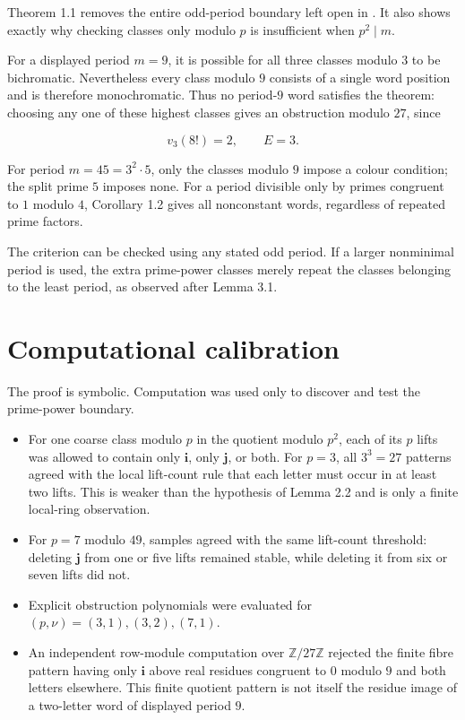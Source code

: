 \documentclass[11pt]{article}
\numberwithin{equation}{section}
\begin{document}
Theorem 1.1 removes the entire odd-period boundary left open in \cite{carptopus2026}. It also
shows exactly why checking classes only modulo $p$ is insufficient when
$p^2\mid m$.

For a displayed period $m=9$, it is possible for all three classes modulo
$3$ to be bichromatic. Nevertheless every class modulo $9$ consists of a
single word position and is therefore monochromatic. Thus no period-$9$
word satisfies the theorem: choosing any one of these highest classes gives
an obstruction modulo $27$, since

\[
v_3(8!)=2,
\qquad E=3.
\]

For period $m=45=3^2\cdot5$, only the classes modulo $9$ impose a colour
condition; the split prime $5$ imposes none. For a period divisible only by
primes congruent to $1$ modulo $4$, Corollary 1.2 gives all nonconstant
words, regardless of repeated prime factors.

The criterion can be checked using any stated odd period. If a larger
nonminimal period is used, the extra prime-power classes merely repeat the
classes belonging to the least period, as observed after Lemma 3.1.

\section{Computational calibration}


The proof is symbolic. Computation was used only to discover and test the
prime-power boundary.

\begin{itemize}
\item For one coarse class modulo $p$ in the quotient modulo $p^2$, each of its
$p$ lifts was allowed to contain only $\mathbf i$, only $\mathbf j$, or
both. For $p=3$, all $3^3=27$ patterns agreed with the local lift-count
rule that each letter must occur in at least two lifts. This is weaker than
the hypothesis of Lemma 2.2 and is only a finite local-ring observation.
\item For $p=7$ modulo $49$, samples agreed with the same lift-count threshold:
deleting $\mathbf j$ from one or five lifts remained stable, while deleting
it from six or seven lifts did not.
\item Explicit obstruction polynomials were evaluated for
$(p,\nu)=(3,1),(3,2),(7,1)$.
\item An independent row-module computation over $\mathbb Z/27\mathbb Z$
rejected the finite fibre pattern having only $\mathbf i$ above real
residues congruent to $0$ modulo $9$ and both letters elsewhere. This
finite quotient pattern is not itself the residue image of a two-letter
word of displayed period $9$.

\end{itemize}
\end{document}
